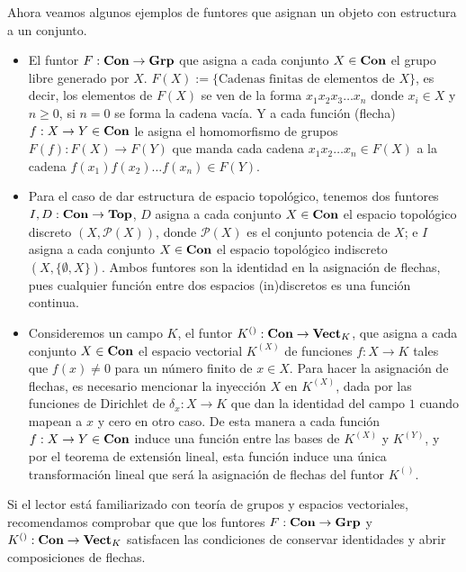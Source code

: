 \documentclass{comunicaciones}
\begin{document}
\begin{ej}
    Ahora veamos algunos ejemplos de funtores que asignan un objeto con estructura a un conjunto.
    \begin{itemize}
        \item El funtor $F:\mathbf{Con}\to\mathbf{Grp}$ que asigna a cada conjunto $X\in\mathbf{Con}$ el grupo libre generado por $X$. $F(X):=\{\text{Cadenas finitas de elementos de }X\}$,
        es decir, los elementos de $F(X)$ se ven de la forma $x_1x_2x_3\ldots x_n$ donde $x_i\in X$ y $n\geq 0$, si $n=0$ se forma la cadena vacía. Y a cada
        función (flecha) $f:X\to Y\in\mathbf{Con}$ le asigna el homomorfismo de grupos $F(f):F(X)\to F(Y)$ que manda cada cadena $x_1x_2\ldots x_n\in F(X)$ a la cadena
        $f(x_1)f(x_2)\ldots f(x_n)\in F(Y)$.
        \item Para el caso de dar estructura de espacio topológico, tenemos dos funtores $I,D:\mathbf{Con}\to\mathbf{Top}$, $D$ asigna a cada conjunto $X\in\mathbf{Con}$ el espacio 
        topológico discreto $(X,\mathcal{P}(X))$, donde $\mathcal{P}(X)$ es el conjunto potencia de $X$; e $I$ asigna a cada conjunto $X\in\mathbf{Con}$ el espacio
        topológico indiscreto $(X,\{\emptyset,X\})$. Ambos funtores son la identidad en la asignación de flechas, pues cualquier función entre dos espacios 
        (in)discretos es una función continua.
        \item Consideremos un campo $K$, el funtor $K^{()}:\mathbf{Con}\to\mathbf{Vect}_K$, que asigna a cada conjunto $X\in\mathbf{Con}$ el espacio vectorial $K^{(X)}$ de
        funciones $f:X\to K$ tales que $f(x)\not=0$ para un número finito de $x\in X$. Para hacer la asignación de flechas, es necesario mencionar la inyección
        $X$ en $K^{(X)}$, dada por las funciones de Dirichlet de $\delta_x:X\to K$ que dan la identidad del campo $1$ cuando mapean a $x$ y cero en otro caso.
        De esta manera a cada función $f:X\to Y\in\mathbf{Con}$ induce una función entre las bases de $K^{(X)}$ y $K^{(Y)}$, y por el teorema de extensión lineal,
        esta función induce una única transformación lineal que será la asignación de flechas del funtor $K^{()}$.
    \end{itemize}
\end{ej}

Si el lector está familiarizado con teoría de grupos y espacios vectoriales, recomendamos comprobar que que los funtores $F:\mathbf{Con}\to\mathbf{Grp}$ y $K^{()}:\mathbf{Con}\to\mathbf{Vect}_K$ 
satisfacen las condiciones de conservar identidades y abrir composiciones de flechas.
\end{document}
